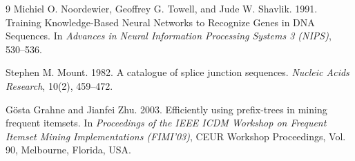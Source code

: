 \documentclass[conference]{IEEEtran}
\begin{document}
\begin{thebibliography}{9}
Michiel O. Noordewier, Geoffrey G. Towell, and Jude W. Shavlik. 1991. Training Knowledge-Based Neural Networks to Recognize Genes in DNA Sequences. In \textit{Advances in Neural Information Processing Systems 3 (NIPS)}, 530--536.

Stephen M. Mount. 1982. A catalogue of splice junction sequences. \textit{Nucleic Acids Research}, 10(2), 459--472.

G\"{o}sta Grahne and Jianfei Zhu. 2003. Efficiently using prefix-trees in mining frequent itemsets. In \textit{Proceedings of the IEEE ICDM Workshop on Frequent Itemset Mining Implementations (FIMI'03)}, CEUR Workshop Proceedings, Vol. 90, Melbourne, Florida, USA.

\end{thebibliography}
\end{document}
